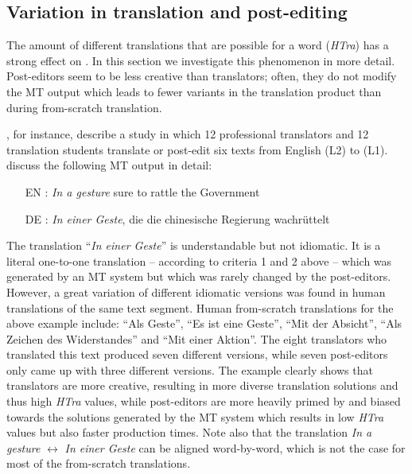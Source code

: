\documentclass[output=paper]{LSP/langsci}
\begin{document}
\subsection{Variation in translation and post-editing}
\label{carl-schaeffer:sec:4.3}

The amount of different translations that are possible for a word (\textit{HTra}) has a strong effect on . In this section we investigate this phenomenon in more detail. 
Post-editors seem to be less creative than translators; often, they do not modify the MT output which leads to fewer variants in the translation product than during from-scratch translation. 

\citet{Culo2014}, for instance, describe a study in which 12 professional translators and 12 translation students translate or post-edit six texts from English (L2) to  (L1). \citet{Culo2014} discuss the following MT output in detail:

\begin{itemize}
\item[EN]: \textit{In a gesture} sure to rattle the  Government
\item[DE]: \textit{In einer Geste}, die die chinesische Regierung wachrüttelt 
\end{itemize}


The  translation ``\textit{In einer Geste}'' is understandable but not idiomatic. It is a literal one-to-one translation -- according to criteria 1 and 2 above -- which was generated by an MT system but which was rarely changed by the post-editors. However, a great variation of different idiomatic versions was found in human translations of the same text segment. Human from-scratch translations for the above example include: ``Als Geste'', ``Es ist eine Geste'', ``Mit der Absicht'', ``Als Zeichen des Widerstandes'' and ``Mit einer Aktion''. The eight translators who translated this text produced seven different versions, while seven post-editors only came up with three different versions. The example clearly shows that translators are more creative, resulting in more diverse translation solutions and thus high \textit{HTra} values, while post-editors are more heavily primed by and biased towards the solutions generated by the MT system which results in low \textit{HTra} values but also faster production times. Note also that the translation \textit{In a gesture} $\leftrightarrow$ \textit{In einer Geste} can be aligned word-by-word, which is not the case for most of the from-scratch translations.
\end{document}
